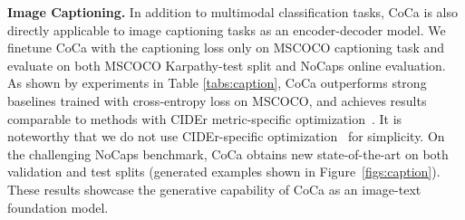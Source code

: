 \textbf{Image Captioning.}
In addition to multimodal classification tasks,
CoCa is also directly applicable to image captioning tasks as an encoder-decoder model.
We finetune CoCa with the captioning loss  only on MSCOCO \cite{chen2015microsoft} captioning task and evaluate on both MSCOCO Karpathy-test split and NoCaps \cite{agrawal2019nocaps} online evaluation.
As shown by experiments in Table \ref{tabs:caption},
CoCa outperforms strong baselines trained with cross-entropy loss on MSCOCO,
and achieves results comparable to methods with CIDEr metric-specific optimization~\cite{rennie2017self}.
It is noteworthy that we do not use CIDEr-specific optimization~\cite{rennie2017self} for simplicity.
On the challenging NoCaps benchmark,
CoCa obtains new state-of-the-art on both validation and test splits (generated examples shown in Figure~\ref{figs:caption}).
These results showcase the generative capability of CoCa as an image-text foundation model.
